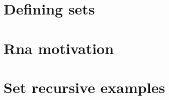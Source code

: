 
\section*{Defining sets}

\vfill
\section*{Rna motivation}

\vfill
\section*{Set recursive examples}

\vfill
